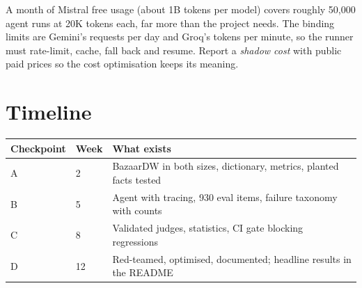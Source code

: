 \documentclass[11pt,a4paper]{article}
\begin{document}
A month of Mistral free usage (about 1B tokens per model) covers roughly 50{,}000 agent runs at
20K tokens each, far more than the project needs. The binding limits are Gemini's requests per
day and Groq's tokens per minute, so the runner must rate-limit, cache, fall back and resume.
Report a \emph{shadow cost} with public paid prices so the cost optimisation keeps its meaning.

\section{Timeline}

\begin{center}
\small
{}
\end{center}

\begin{center}
\small
\begin{tabularx}{\linewidth}{@{}l l X@{}}
\toprule
\textbf{Checkpoint} & \textbf{Week} & \textbf{What exists}\\
\midrule
A & 2 & BazaarDW in both sizes, dictionary, metrics, planted facts tested\\
B & 5 & Agent with tracing, 930 eval items, failure taxonomy with counts\\
C & 8 & Validated judges, statistics, CI gate blocking regressions\\
D & 12 & Red-teamed, optimised, documented; headline results in the README\\
\bottomrule
\end{tabularx}
\end{center}
\end{document}
